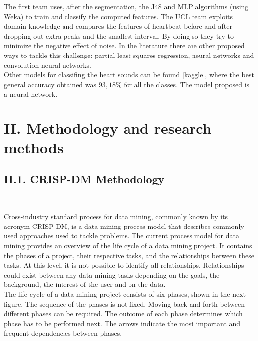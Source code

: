 \documentclass[11pt, a4papper]{report}
\theoremstyle{plain}
\theoremstyle{definition}
\theoremstyle{definition}
\theoremstyle{proposition}
\begin{document}
The first team uses, after the segmentation, the J48 and MLP algorithms (using Weka) to train and classify the computed features. The UCL team exploits domain knowledge and compares the features of heartbeat before and after dropping out extra peaks and the smallest interval. By doing so they try to minimize the negative effect of noise. In the literature there are other proposed ways to tackle this challenge: partial least squares regression, neural networks and convolution neural networks.
\\

Other models for classifing the heart sounds can be found [kaggle], where the best general accuracy obtained was $93,18 \%$ for all the classes. The model proposed is a neural network.


\newpage



\chapter*{II. Methodology and research methods}

\section*{II.1. CRISP-DM Methodology}
\

Cross-industry standard process for data mining, commonly known by its acronym CRISP-DM, is a data mining process model that describes commonly used approaches used to tackle problems. The current process model for data mining provides an overview of the life cycle of a data mining project. It contains the phases of a project, their respective tasks, and the relationships between these tasks. At this level, it is not possible to identify all relationships. Relationships could exist between any data mining tasks depending on the goals, the background, the interest of the user and on the data. 
\\

The life cycle of a data mining project consists of six phases, shown in the next figure. The sequence of the phases is not fixed. Moving back and forth between different phases can be required. The outcome of each phase determines which phase has to be performed next. The arrows indicate the most important and frequent dependencies between phases.
\\
\end{document}
